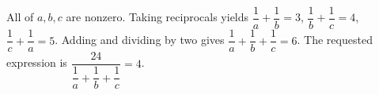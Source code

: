 All of $a,b,c$ are nonzero. Taking reciprocals yields $\dfrac{1}{a}+\dfrac{1}{b}=3$, $\dfrac{1}{b}+\dfrac{1}{c}=4$, $\dfrac{1}{c}+\dfrac{1}{a}=5$. Adding and dividing by two gives $\dfrac{1}{a}+\dfrac{1}{b}+\dfrac{1}{c}=6$. The requested expression is $\dfrac{24}{\dfrac{1}{a}+\dfrac{1}{b}+\dfrac{1}{c}}=\boxed4$.

